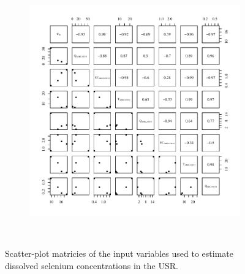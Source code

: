 \begin{linenumbers}
\begin{landscape}
\begin{figure}
\begin{subfigure}{0.7\textwidth}
		\end{subfigure}%
		\begin{subfigure}{0.7\textwidth}
			\centering			
			\includegraphics[width=\tableCustomSize]{"Figures/Results_USR/Stochastic/Conc Model Full PairsHRC"}
		\end{subfigure}\\
		\caption{Scatter-plot matricies of the input variables used to estimate dissolved selenium concentrations in the USR.}
	\end{figure}
\end{landscape}
\subfiguremid
\begin{landscape}
	\begin{figure}
		\begin{subfigure}{0.7\textwidth}
			\centering

\end{subfigure}
\end{figure}
\end{landscape}
\end{linenumbers}
